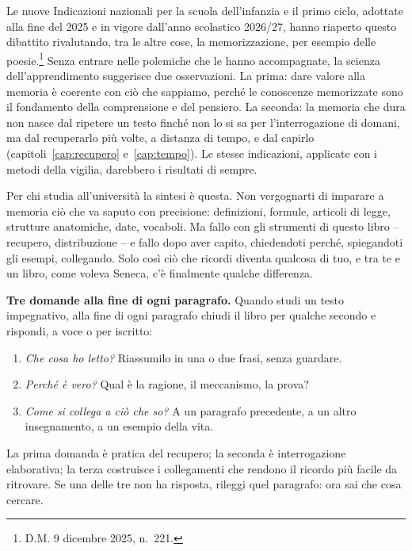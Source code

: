 Le nuove Indicazioni nazionali per la scuola dell'infanzia e il primo
ciclo, adottate alla fine del 2025 e in vigore dall'anno scolastico
2026/27, hanno riaperto questo dibattito rivalutando, tra le altre
cose, la memorizzazione, per esempio delle poesie.\footnote{D.M. 9
dicembre 2025, n.~221.} Senza entrare nelle polemiche che le hanno
accompagnate, la scienza dell'apprendimento suggerisce due
osservazioni. La prima: dare valore alla memoria è coerente con ciò che
sappiamo, perché le conoscenze memorizzate sono il fondamento della
comprensione e del pensiero. La seconda: la memoria che dura non nasce
dal ripetere un testo finché non lo si sa per l'interrogazione di
domani, ma dal recuperarlo più volte, a distanza di tempo, e dal
capirlo (capitoli~\ref{cap:recupero} e~\ref{cap:tempo}). Le stesse
indicazioni, applicate con i metodi della vigilia, darebbero i risultati
di sempre.

Per chi studia all'università la sintesi è questa. Non vergognarti di
imparare a memoria ciò che va saputo con precisione: definizioni,
formule, articoli di legge, strutture anatomiche, date, vocaboli. Ma
fallo con gli strumenti di questo libro -- recupero, distribuzione -- e
fallo dopo aver capito, chiedendoti perché, spiegandoti gli esempi,
collegando. Solo così ciò che ricordi diventa qualcosa di tuo, e tra te
e un libro, come voleva Seneca, c'è finalmente qualche differenza.

\begin{inpratica}
\textbf{Tre domande alla fine di ogni paragrafo.} Quando studi un testo
impegnativo, alla fine di ogni paragrafo chiudi il libro per qualche
secondo e rispondi, a voce o per iscritto:
\begin{enumerate}
  \item \emph{Che cosa ho letto?} Riassumilo in una o due frasi, senza
        guardare.
  \item \emph{Perché è vero?} Qual è la ragione, il meccanismo, la
        prova?
  \item \emph{Come si collega a ciò che so?} A un paragrafo
        precedente, a un altro insegnamento, a un esempio della vita.
\end{enumerate}
La prima domanda è pratica del recupero; la seconda è interrogazione
elaborativa; la terza costruisce i collegamenti che rendono il ricordo
più facile da ritrovare. Se una delle tre non ha risposta, rileggi quel
paragrafo: ora sai che cosa cercare.
\end{inpratica}

